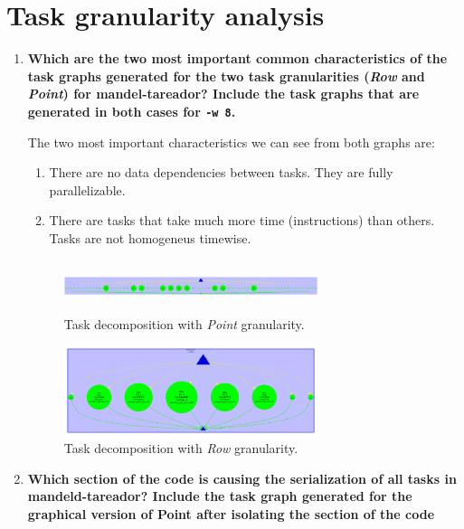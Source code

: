 \documentclass[a4paper,11pt]{article}
\newcommand{\answerspace}{\vspace{0.5cm}}
\begin{document}
\section{Task granularity analysis}
\begin{enumerate}
\setcounter{enumi}{0}
\item
\textbf{Which are the two most important common
    characteristics of the task graphs generated for the two task
    granularities (\emph{Row} and \emph{Point}) for
    \textbf{mandel-tareador}?  Include the task graphs that are
    generated in both cases for \texttt{-w 8}.}

\answerspace
The two most important characteristics we can see from both graphs are:
\begin{enumerate}[(1)]
  \item There are no data dependencies between tasks. They are fully parallelizable.
  \item There are tasks that take much more time (instructions) than
    others. Tasks are not homogeneus timewise.
\end{enumerate}

\begin{figure}[h!]
\includegraphics[width=0.7\textwidth, height=1.5cm]{figures/point_deps_mandel.pdf}
\caption{Task decomposition with \emph{Point} granularity.}
\label{figure:mandel-point}
\end{figure}

\begin{figure}[h!]
\includegraphics[width=0.7\textwidth]{figures/row_deps_mandel.pdf}
\caption{Task decomposition with \emph{Row} granularity.}
\label{figure:mandel-row}
\end{figure}
\newpage
\setcounter{enumi}{1}
\item
\textbf{Which section of the code is causing the serialization of
    all tasks in mandeld-tareador? Include the task graph generated for
    the graphical version of Point after isolating the section of the
    code}


\end{enumerate}
\end{document}
